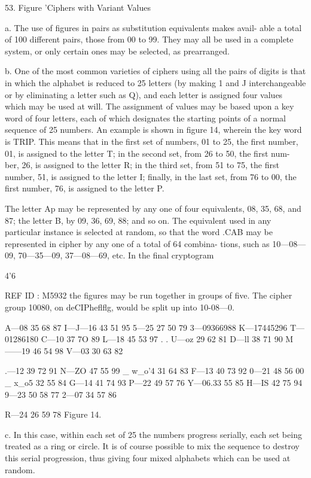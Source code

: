 {{53. Figure 'Ciphers with Variant Values

a. The use of ﬁgures in pairs as substitution equivalents makes avail-
able a total of 100 different pairs, those from 00 to 99. They may all
be used in a complete system, or only certain ones may be selected, as
prearranged.

b. One of the most common varieties of ciphers using all the pairs of
digits is that in which the alphabet is reduced to 25 letters (by making
1 and J interchangeable or by eliminating a letter such as Q), and each
letter is assigned four values which may be used at will. The assignment
of values may be based upon a key word of four letters, each of which
designates the starting points of a normal sequence of 25 numbers. An
example is shown in ﬁgure 14, wherein the key word is TRIP. This
means that in the ﬁrst set of numbers, 01 to 25, the ﬁrst number, 01, is
assigned to the letter T; in the second set, from 26 to 50, the ﬁrst num-
ber, 26, is assigned to the letter R; in the third set, from 51 to 75, the
ﬁrst number, 51, is assigned to the letter I; ﬁnally, in the last set, from
76 to 00, the ﬁrst number, 76, is assigned to the letter P.

The letter Ap may be represented by any one of four equivalents, 08,
35, 68, and 87; the letter B, by 09, 36, 69, 88; and so on. The equivalent
used in any particular instance is selected at random, so that the word
.CAB may be represented in cipher by any one of a total of 64 combina-
tions, such as 10—08—09, 70—35—09, 37—08—69, etc. In the ﬁnal cryptogram

4'6

REF ID : M5932
the ﬁgures may be run together in groups of ﬁve. The cipher group
10080, on deCIPheﬂﬂg, would be split up into 10-08—0.

A—08 35 68 87 I—J—16 43 51 95 5—25 27 50 79
3—09366988 K—17445296 T—01286180
C—10 37 7O 89 L—18 45 53 97 . . U—oz 29 62 81
D—ll 38 71 90 M——19 46 54 98 V—03 30 63 82

.—12 39 72 91 N—ZO 47 55 99 _ w_o'4 31 64 83
F—13 40 73 92 0—21 48 56 00 _ x_o5 32 55 84
G—14 41 74 93 P—22 49 57 76 Y—06.33 55 85
H—IS 42 75 94 9—23 50 58 77 2—07 34 57 86

R—24 26 59 78
Figure 14.

c. In this case, within each set of 25 the numbers progress serially,
each set being treated as a ring or circle. It is of course possible to mix
the sequence to destroy this serial progression, thus giving four mixed
alphabets which can be used at random.

}}
